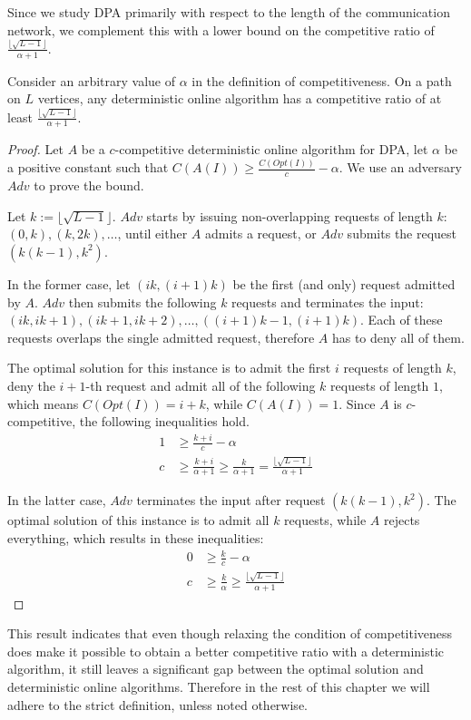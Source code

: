 Since we study DPA primarily with respect to the length of the
communication network, we complement this with a lower bound on the
competitive ratio of $\frac{\lfloor\sqrt{L-1}\rfloor}{\alpha+1}$.

\begin{theorem}\label{theorem:relaxed-dpa-deterministic}
    Consider an arbitrary value of $\alpha$ in the definition of
    competitiveness. On a path on $L$ vertices, any deterministic online
    algorithm has a competitive ratio of at least
    $\frac{\lfloor\sqrt{L-1}\rfloor}{\alpha+1}$.
\end{theorem}

\begin{proof}
    Let $A$ be a $c$-competitive deterministic online algorithm for DPA,
    let $\alpha$ be a positive constant such that $C(A(I)) \geq
    \frac{C(Opt(I))}{c} - \alpha$. We use an adversary $Adv$ to prove the
    bound.

    Let $k := \lfloor\sqrt{L-1}\rfloor$. $Adv$ starts by issuing
    non-overlapping requests of length $k$: $(0, k), (k, 2k), \dots$,
    until either $A$ admits a request, or $Adv$ submits the request
    $(k(k-1), k^2)$.

    In the former case, let $(ik, (i+1)k)$ be the first (and only) request
    admitted by $A$. $Adv$ then submits the following $k$ requests and
    terminates the input: $(ik, ik+1), (ik+1, ik+2), \dots, ((i+1)k-1,
    (i+1)k)$. Each of these requests overlaps the single admitted request,
    therefore $A$ has to deny all of them.

    The optimal solution for this instance is to admit the first $i$
    requests of length $k$, deny the $i+1$-th request and admit all of the
    following $k$ requests of length $1$, which means $C(Opt(I)) = i+k$,
    while $C(A(I)) = 1$. Since $A$ is $c$-competitive, the following
    inequalities hold.
    \begin{align*}
        1 &\geq \frac{k+i}{c} - \alpha \\
        c &\geq \frac{k+i}{\alpha + 1} \geq \frac{k}{\alpha + 1} =
        \frac{\lfloor\sqrt{L-1}\rfloor}{\alpha + 1}
    \end{align*}

    In the latter case, $Adv$ terminates the input after request $(k(k-1),
    k^2)$. The optimal solution of this instance is to admit all $k$
    requests, while $A$ rejects everything, which results in these
    inequalities:
    \begin{align*}
        0 &\geq \frac{k}{c} - \alpha \\
        c &\geq \frac{k}{\alpha} \geq \frac{\lfloor\sqrt{L-1}\rfloor}{\alpha + 1}
    \end{align*}
\end{proof}

This result indicates that even though relaxing the condition of
competitiveness does make it possible to obtain a better competitive ratio
with a deterministic algorithm, it still leaves a significant gap between
the optimal solution and deterministic online algorithms. Therefore in the
rest of this chapter we will adhere to the strict definition, unless noted
otherwise.
